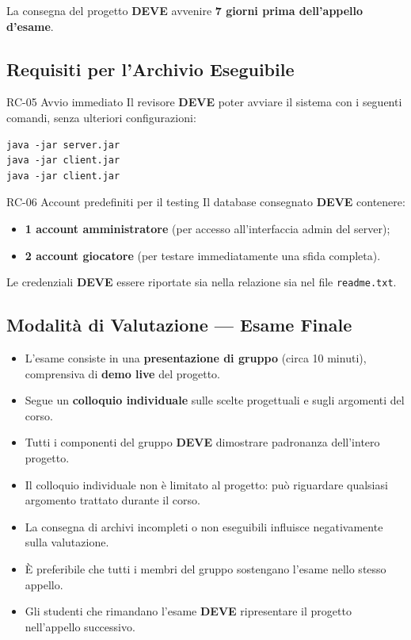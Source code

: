 \documentclass[12pt, a4paper]{article}
\newcommand{\mustshall}{\textbf{DEVE}}
\newcommand{\code}[1]{\texttt{#1}}
\begin{document}
\begin{constraintbox}
La consegna del progetto \mustshall{} avvenire \textbf{7 giorni prima dell'appello d'esame}.
\end{constraintbox}

\subsection{Requisiti per l'Archivio Eseguibile}

\begin{reqbox}{RC-05 \quad Avvio immediato \quad [MUST]}
Il revisore \mustshall{} poter avviare il sistema con i seguenti comandi, senza ulteriori configurazioni:
\begin{lstlisting}[language={}]
java -jar server.jar
java -jar client.jar
java -jar client.jar
\end{lstlisting}
\end{reqbox}

\begin{reqbox}{RC-06 \quad Account predefiniti per il testing \quad [MUST]}
Il database consegnato \mustshall{} contenere:
\begin{itemize}
    \item \textbf{1 account amministratore} (per accesso all'interfaccia admin del server);
    \item \textbf{2 account giocatore} (per testare immediatamente una sfida completa).
\end{itemize}
Le credenziali \mustshall{} essere riportate sia nella relazione sia nel file \code{readme.txt}.
\end{reqbox}

\subsection{Modalità di Valutazione — Esame Finale}

\begin{itemize}[leftmargin=*]
    \item L'esame consiste in una \textbf{presentazione di gruppo} (circa 10 minuti), comprensiva di \textbf{demo live} del progetto.
    \item Segue un \textbf{colloquio individuale} sulle scelte progettuali e sugli argomenti del corso.
    \item Tutti i componenti del gruppo \mustshall{} dimostrare padronanza dell'intero progetto.
    \item Il colloquio individuale non è limitato al progetto: può riguardare qualsiasi argomento trattato durante il corso.
    \item La consegna di archivi incompleti o non eseguibili influisce negativamente sulla valutazione.
    \item È preferibile che tutti i membri del gruppo sostengano l'esame nello stesso appello.
    \item Gli studenti che rimandano l'esame \mustshall{} ripresentare il progetto nell'appello successivo.
\end{itemize}
\end{document}
